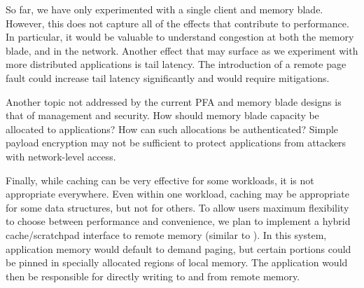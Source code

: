 So far, we have only experimented with a single client and memory blade.
However, this does not capture all of the effects that contribute to
performance. In particular, it would be valuable to understand congestion at
both the memory blade, and in the network. Another effect that may surface as
we experiment with more distributed applications is tail latency. The
introduction of a remote page fault could increase tail latency significantly
and would require mitigations.

Another topic not addressed by the current PFA and memory blade designs is that
of management and security. How should memory blade capacity be allocated to
applications? How can such allocations be authenticated? Simple payload
encryption may not be sufficient to protect applications from attackers with
network-level access.

Finally, while caching can be very effective for some workloads, it is not
appropriate everywhere. Even within one workload, caching may be appropriate
for some data structures, but not for others. To allow users maximum
flexibility to choose between performance and convenience, we plan to implement
a hybrid cache/scratchpad interface to remote memory (similar to \cite{vls}).
In this system, application memory would default to demand paging, but certain
portions could be pinned in specially allocated regions of local memory. The
application would then be responsible for directly writing to and from remote
memory.
